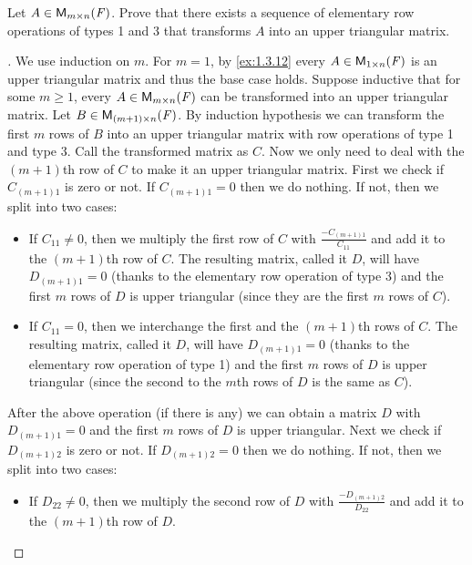 \begin{ex}\label{ex:3.1.12}
  Let \(A \in \ms\).
  Prove that there exists a sequence of elementary row operations of types 1 and 3 that transforms \(A\) into an upper triangular matrix.
\end{ex}

\begin{proof}[]
  We use induction on \(m\).
  For \(m = 1\), by \cref{ex:1.3.12} every \(A \in \ms[1][n][\F]\) is an upper triangular matrix and thus the base case holds.
  Suppose inductive that for some \(m \geq 1\), every \(A \in \ms\) can be transformed into an upper triangular matrix.
  Let \(B \in \ms[(m + 1)][n][\F]\).
  By induction hypothesis we can transform the first \(m\) rows of \(B\) into an upper triangular matrix with row operations of type 1 and type 3.
  Call the transformed matrix as \(C\).
  Now we only need to deal with the \((m + 1)\)th row of \(C\) to make it an upper triangular matrix.
  First we check if \(C_{(m + 1) 1}\) is zero or not.
  If \(C_{(m + 1) 1} = 0\) then we do nothing.
  If not, then we split into two cases:
  \begin{itemize}
    \item If \(C_{1 1} \neq 0\), then we multiply the first row of \(C\) with \(\frac{-C_{(m + 1) 1}}{C_{1 1}}\) and add it to the \((m + 1)\)th row of \(C\).
          The resulting matrix, called it \(D\), will have \(D_{(m + 1) 1} = 0\) (thanks to the elementary row operation of type 3) and the first \(m\) rows of \(D\) is upper triangular (since they are the first \(m\) rows of \(C\)).
    \item If \(C_{1 1} = 0\), then we interchange the first and the \((m + 1)\)th rows of \(C\).
          The resulting matrix, called it \(D\), will have \(D_{(m + 1) 1} = 0\) (thanks to the elementary row operation of type 1) and the first \(m\) rows of \(D\) is upper triangular (since the second to the \(m\)th rows of \(D\) is the same as \(C\)).
  \end{itemize}
  After the above operation (if there is any) we can obtain a matrix \(D\) with \(D_{(m + 1) 1} = 0\) and the first \(m\) rows of \(D\) is upper triangular.
  Next we check if \(D_{(m + 1) 2}\) is zero or not.
  If \(D_{(m + 1) 2} = 0\) then we do nothing.
  If not, then we split into two cases:
  \begin{itemize}
    \item If \(D_{2 2} \neq 0\), then we multiply the second row of \(D\) with \(\frac{-D_{(m + 1) 2}}{D_{2 2}}\) and add it to the \((m + 1)\)th row of \(D\).

\end{itemize}
\end{proof}
